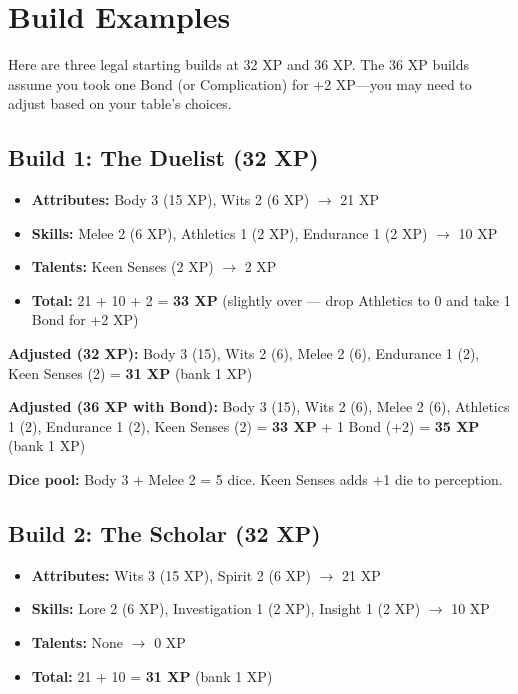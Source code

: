 \section{Build Examples}

Here are three legal starting builds at 32 XP and 36 XP. The 36 XP builds assume you took one Bond (or Complication) for +2 XP---you may need to adjust based on your table's choices.

\subsection{Build 1: The Duelist (32 XP)}

\begin{itemize}
  \item \textbf{Attributes:} Body 3 (15 XP), Wits 2 (6 XP) $\rightarrow$ 21 XP
  \item \textbf{Skills:} Melee 2 (6 XP), Athletics 1 (2 XP), Endurance 1 (2 XP) $\rightarrow$ 10 XP
  \item \textbf{Talents:} Keen Senses (2 XP) $\rightarrow$ 2 XP
  \item \textbf{Total:} 21 + 10 + 2 = \textbf{33 XP} (slightly over — drop Athletics to 0 and take 1 Bond for +2 XP)
\end{itemize}

\textbf{Adjusted (32 XP):} Body 3 (15), Wits 2 (6), Melee 2 (6), Endurance 1 (2), Keen Senses (2) = \textbf{31 XP} (bank 1 XP)

\textbf{Adjusted (36 XP with Bond):} Body 3 (15), Wits 2 (6), Melee 2 (6), Athletics 1 (2), Endurance 1 (2), Keen Senses (2) = \textbf{33 XP} + 1 Bond (+2) = \textbf{35 XP} (bank 1 XP)

\textbf{Dice pool:} Body 3 + Melee 2 = 5 dice. Keen Senses adds +1 die to perception.

\subsection{Build 2: The Scholar (32 XP)}

\begin{itemize}
  \item \textbf{Attributes:} Wits 3 (15 XP), Spirit 2 (6 XP) $\rightarrow$ 21 XP
  \item \textbf{Skills:} Lore 2 (6 XP), Investigation 1 (2 XP), Insight 1 (2 XP) $\rightarrow$ 10 XP
  \item \textbf{Talents:} None $\rightarrow$ 0 XP
  \item \textbf{Total:} 21 + 10 = \textbf{31 XP} (bank 1 XP)
\end{itemize}

